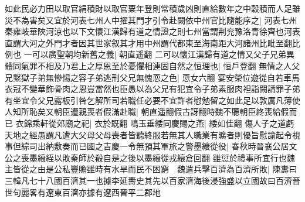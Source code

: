 如此民必力田以取官絹積財以取官粟年登則常積歲凶則直給數年之中穀積而人足雖災不為害矣又宜於河表七州人中擢其門才引令赴闕依中州官比隨能序之|{
	河表七州秦雍岐華陜河涼也以下文懷江漢歸有道之情證之則七州當謂荆兖豫洛青徐齊也河表直謂大河之外門才者因其世家叙其才用中州謂代都東至海南距大河諸州比毗至翻比例也}
一可以廣聖朝均新舊之義|{
	朝直遥翻}
二可以懷江漢歸有道之情又父子兄弟異體同氣罪不相及乃君上之厚恩至於憂懼相連固自然之恒理也|{
	恒戶登翻}
無情之人父兄繫獄子弟無慘惕之容子弟逃刑父兄無愧恧之色|{
	恧女六翻}
宴安榮位遊從自若車馬衣冠不變華飾骨肉之恩豈當然也臣愚以為父兄有犯宜令子弟素服肉袒詣闕請罪子弟有坐宜令父兄露板引咎乞解所司若職任必要不宜許者慰勉留之如此足以敦厲凡薄使人知所恥矣又朝臣遭親喪者假滿赴職|{
	朝直遥翻假古訝翻時魏不聽朝臣終喪給假而已}
衣錦乘軒從郊廟之祀|{
	衣於既翻}
鳴玉垂緌同慶賜之燕|{
	緌如佳翻}
傷人子之道虧天地之經愚謂凡遭大父母父母喪者皆聽終服若無其人職業有曠者則優旨慰諭起令視事但綜司出納敷奏而已國之吉慶一令無預其軍旅之警墨縗從役|{
	春秋時晉襄公居文公之喪墨縗絰以敗秦師於殽自是之後以墨縗從戎縗倉回翻}
雖愆於禮事所宜行也魏主皆從之由是公私豐贍雖時有水旱而民不困窮　魏遣兵擊百濟為百濟所敗|{
	陳夀曰三韓凡七十八國百濟其一也據李延夀史其先以百家濟海後浸強盛以立國故曰百濟晉世句麗畧有遼東百濟亦據有遼西晉平二郡地}


